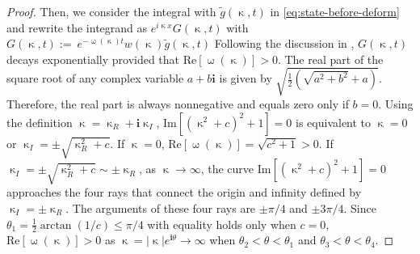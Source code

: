 \documentclass[journal,twoside,web]{ieeecolor}
\newcommand{\im}{\mathbf{i}}
\newcommand{\abs}[1]{\left|#1\right|}
\newcommand{\wcomplex}{\upomega}
\newcommand{\kcomplex}{\upkappa}
\begin{document}
\begin{proof}
Then, we consider the integral with $\tilde{g}(\kcomplex,t)$ in \eqref{eq:state-before-deform} and rewrite the integrand as $e^{i\kcomplex x}G(\kcomplex,t)$ with $G(\kcomplex,t) := \ e^{-\wcomplex(\kcomplex)t}w(\kcomplex)\tilde{g}(\kcomplex,t)$
Following the discussion in , $G(\kcomplex,t)$ decays exponentially provided that $\text{Re}[\wcomplex(\kcomplex)] >0$. 
The real part of the square root of any complex variable $a+b\im$ is given by $\sqrt{\frac{1}{2}(\sqrt{a^2+b^2}+a)}$. 
Therefore, the real part is always nonnegative and equals zero only if $b=0$. Using the definition $\kcomplex=\kcomplex_R+\im \kcomplex_I$, $\text{Im}[(\kcomplex^2+c)^2 + 1]=0$ is equivalent to $\kcomplex=0$ or $\kcomplex_I=\pm\sqrt{\kcomplex_R^2+c}$. If $\kcomplex=0$, $\text{Re}[\wcomplex(\kcomplex)] = \sqrt{c^2+1}>0$. If $\kcomplex_I=\pm\sqrt{\kcomplex_R^2+c}\sim \pm \kcomplex_R$, as $\kcomplex\to\infty$, the curve $\text{Im}[(\kcomplex^2+c)^2 + 1]=0$ approaches the four rays that connect the origin and infinity defined by $\kcomplex_I=\pm \kcomplex_R$. The arguments of these four rays are $\pm\pi/4$ and 
$\pm3\pi/4$. Since $\theta_1=\frac{1}{2}\arctan(1/c)\leq\pi/4$ with equality holds only when $c=0$, $ \text{Re}[\wcomplex(\kcomplex)] >0$ as $\kcomplex=\abs{\kcomplex}e^{\im\theta}\to\infty$ when  $\theta_2<\theta<\theta_1$ and $\theta_3<\theta<\theta_4$.


\end{proof}
\end{document}
